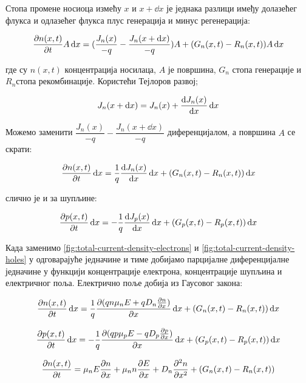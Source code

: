 \documentclass{article}
\begin{document}
Стопа промене носиоца измећу $x$ и $x + \dd{x}$ је једнака разлици имеђу долазећег флукса и одлазећег флукса плус  генерација и минус регенерација:


\begin{equation*}
	\pdv{n(x,t)}{t} A \dd{x}  =( \dfrac{J_n(x)}{-q} - \dfrac{J_n(x + \dd{x})}{-q}) A+ (G_n(x,t) - R_n(x,t)) A \dd{x}
\end{equation*}

где су $n(x,t)$ концентрација носилаца, $A$ је површина, $G_n$ стопа генерације и $R_n $стопа рекомбинације. Користећи Тејлоров развој;

\begin{equation*}
	J_n(x + \dd{x}) = J_n(x) + \dv{J_n(x)}{x} \dd{x}
\end{equation*}

Можемо заменити $\dfrac{J_n(x)}{-q} - \dfrac{J_n(x + \dd{x})}{-q}$ диференцијалом, а површина $A$ се скрати:

\begin{equation*}
	\pdv{n(x,t)}{t} \dd{x}  = \dfrac{1}{q} \dv{J_n(x)}{x} \dd{x}  + (G_n(x,t) - R_n(x,t)) \dd{x}
\end{equation*}

слично је и за шупљине:

\begin{equation*}
	\pdv{p(x,t)}{t} \dd{x}  = - \dfrac{1}{q} \dv{J_p(x)}{x} \dd{x}  + (G_p(x,t) - R_p(x,t)) \dd{x}
\end{equation*}

Када заменимо \ref{fig:total-current-density-electrons} и \ref{fig:total-current-density-holes} у одговарајуће једначине и тиме добијамо парцијалне диференцијалне једначине у функцији концентрације електрона, концентрације шупљина и електричног поља. Електрично поље добија из Гаусовог закона:

\begin{equation*}
	\pdv{n(x,t)}{t} \dd{x}  = \dfrac{1}{q} \pdv{(qn \mu_n E + q D_n \pdv{n}{x})}{x} \dd{x}  + (G_n(x,t) - R_n(x,t)) \dd{x}
\end{equation*}

\begin{equation*}
	\pdv{p(x,t)}{t} \dd{x}  = - \dfrac{1}{q} \pdv{(qp \mu_p E - q D_p \pdv{p}{x})}{x} \dd{x}  + (G_p(x,t) - R_p(x,t)) \dd{x}
\end{equation*}


\begin{equation*}
	\pdv{n(x,t)}{t}  = \mu_n E \pdv{n}{x} + \mu_n n \pdv{E}{x}  +  D_n \frac{\partial^2 n}{\partial x^2}   + (G_n(x,t) - R_n(x,t))
\end{equation*}
\end{document}
